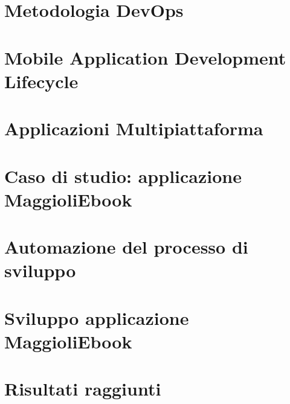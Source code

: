 \documentclass[12pt,a4paper,twoside,openright]{report}
\begin{document}
  


\newpage

\tableofcontents

\setlength{\parindent}{0em}
\setlength{\parskip}{1em}

\clearpage{\pagestyle{empty}\cleardoublepage}
\chapter{Metodologia DevOps}
\label{ch:devops}


\clearpage{\pagestyle{empty}\cleardoublepage}
\chapter{Mobile Application Development Lifecycle}
\label{ch:sdlc}


\clearpage{\pagestyle{empty}\cleardoublepage}
\chapter{Applicazioni Multipiattaforma}
\label{ch:app-multiplatform}


\clearpage{\pagestyle{empty}\cleardoublepage}
\chapter{Caso di studio: applicazione MaggioliEbook}
\label{ch:casodistudio}


\clearpage{\pagestyle{empty}\cleardoublepage}
\chapter{Automazione del processo di sviluppo}
\label{ch:cicd}


\clearpage{\pagestyle{empty}\cleardoublepage}
\chapter{Sviluppo applicazione MaggioliEbook}
\label{ch:maggioliebook}


\clearpage{\pagestyle{empty}\cleardoublepage}
\chapter{Risultati raggiunti}
\label{ch:risultati}

\end{document}
